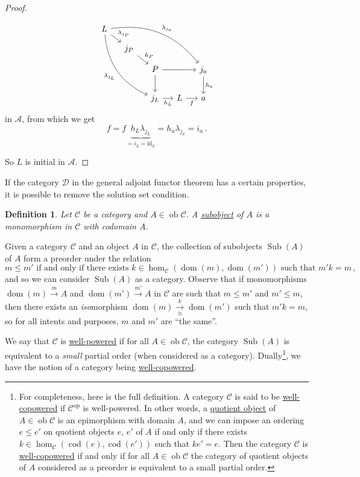 \documentclass[a4paper,11pt]{article}
\theoremstyle{break_italics}
\newtheorem*{definition*}{Definition}
\theoremstyle{break_upright}
\theoremstyle{remark}
\newcommand{\id}{\mathrm{id}}
\newcommand{\ob}{\operatorname{ob}}
\newcommand{\C}{\mathcal{C}}
\newcommand{\D}{\mathcal{D}}
\newcommand{\op}{\mathrm{op}}
\newcommand{\dom}{\operatorname{dom}}
\newcommand{\cod}{\operatorname{cod}}
\begin{document}
\begin{proof}
\begin{enumerate}
\[\begin{tikzcd}[sep = small]
L \arrow[rd, "\lambda_{j_P}"] \arrow[rrrrdd, "\lambda_{j_a}", bend left] \arrow[rrdddd, "\lambda_{j_L}"', bend right] & &  & &   \\
& j_P \arrow[rd, "h_P"] &   &  &    \\
    & & P \arrow[rr] \arrow[dd] & & j_a \arrow[dd, "h_a"] \\
& &   & &   \\
 &  & j_L \arrow[r, "h_L"']   & L \arrow[r, "f"'] & a                    
\end{tikzcd}
\]
in $\mathcal A$, from which we get
	\[
		f = f \underbrace{h_L\lambda_{j_L}}_{= i_L = \id_L} = h_a\lambda_{j_a} = i_a\,.
	\]
\end{enumerate}
So $L$ is initial in $\mathcal A$.
\end{proof}







If the category $\D$ in the general adjoint functor theorem has a certain properties, it is possible to remove the solution set condition.

\begin{definition*}
	Let $\C$ be a category and $A \in \ob\C$. A \uline{subobject} of $A$ is a monomorphism in $\C$ with codomain $A$.
\end{definition*}

Given a category $\C$ and an object $A$ in $\C$, the collection of subobjects $\operatorname{Sub}(A)$ of $A$ form a preorder under the relation
\[
	m \leq m' \text{ if and only if there exists } k \in \hom_\C(\dom(m), \dom(m')) \text{ such that } m'k = m\,, 
\]
and so we can consider $\operatorname{Sub}(A)$ as a category. Observe that if monomorphisms $\dom(m) \xrightarrow{m} A$ and $\dom(m') \xrightarrow{m'} A$ in $\C$ are such that $m \leq m'$ and $m' \leq m$, then there exists an \textit{iso}morphism $\dom(m) \xrightarrow[\cong]{k} \dom(m')$ such that $m'k = m$, so for all intents and purposes, $m$ and $m'$ are ``the same''.

We say that $\C$ is \uline{well-powered} if for all $A\in\ob\C$, the category $\operatorname{Sub}(A)$ is equivalent to a \textit{small} partial order (when considered as a category). Dually\footnote{For completeness, here is the full definition. A category $\C$ is said to be \uline{well-copowered} if $\C^\op$ is well-powered. In other words, a \uline{quotient object} of $A \in \ob\C$ is an epimorphism with domain $A$, and we can impose an ordering $e \leq e'$ on quotient objects $e$, $e'$ of $A$ if and only if there exists $k \in \hom_\C(\cod(e), \cod(e'))$ such that $ke' = e$. Then the category $\C$ is \uline{well-copowered} if and only if for all $A \in\ob\C$ the category of quotient objects of $A$ considered as a preorder is equivalent to a small partial order.}, we have the notion of a category being \uline{well-copowered}.
\end{document}
